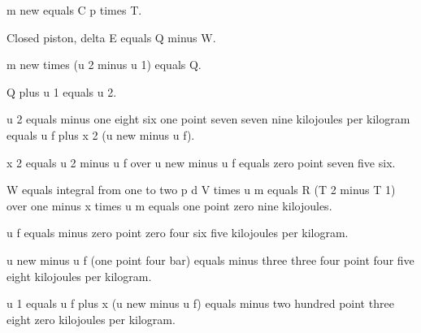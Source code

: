 m new equals C p times T.

Closed piston, delta E equals Q minus W.

m new times (u 2 minus u 1) equals Q.

Q plus u 1 equals u 2.

u 2 equals minus one eight six one point seven seven nine kilojoules per kilogram equals u f plus x 2 (u new minus u f).

x 2 equals u 2 minus u f over u new minus u f equals zero point seven five six.

W equals integral from one to two p d V times u m equals R (T 2 minus T 1) over one minus x times u m equals one point zero nine kilojoules.

u f equals minus zero point zero four six five kilojoules per kilogram.

u new minus u f (one point four bar) equals minus three three four point four five eight kilojoules per kilogram.

u 1 equals u f plus x (u new minus u f) equals minus two hundred point three eight zero kilojoules per kilogram.